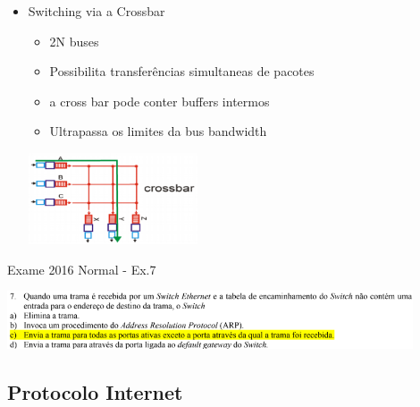 \documentclass[../resumosRCOM.tex]{subfiles}
\begin{document}
\begin{itemize}
\begin{itemize}
\begin{itemize}
\begin{center}
            \end{center}
            \item Switching via a Crossbar
            \begin{itemize}
                \item 2N buses
                \item Possibilita transferências simultaneas de pacotes
                \item a cross bar pode conter buffers intermos
                \item Ultrapassa os limites da bus bandwidth
            \end{itemize}
            \begin{center}
                \includegraphics[width=5cm]{images/RCOM8.png}
            \end{center}
        \end{itemize}
        Exame 2016 Normal - Ex.7
        \begin{center}
            \includegraphics[width=12cm]{images/RCOM51.png}
        \end{center}
    \end{itemize}
\end{itemize}

\subsection{Protocolo Internet}
\end{document}
